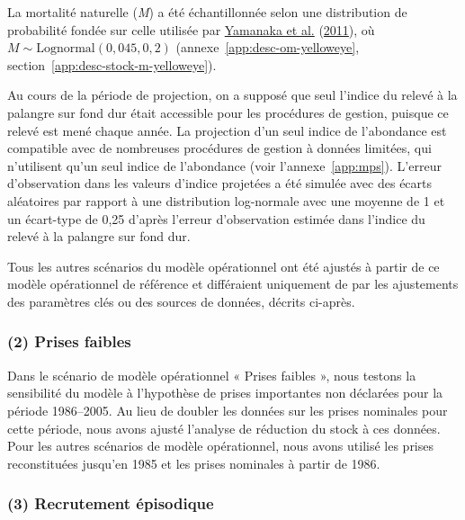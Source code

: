 \documentclass[11pt]{book}
\begin{document}
La mortalité naturelle (\emph{M}) a été échantillonnée selon une distribution de probabilité fondée sur celle utilisée par \protect\hyperlink{ref-yamanaka2011}{Yamanaka et al.} (\protect\hyperlink{ref-yamanaka2011}{2011}), où \(M \sim \textrm{Lognormal}(0,045, 0,2)\) (annexe~\ref{app:desc-om-yelloweye}, section~\ref{app:desc-stock-m-yelloweye}).

Au cours de la période de projection, on a supposé que seul l'indice du relevé à la palangre sur fond dur était accessible pour les procédures de gestion, puisque ce relevé est mené chaque année. La projection d'un seul indice de l'abondance est compatible avec de nombreuses procédures de gestion à données limitées, qui n'utilisent qu'un seul indice de l'abondance (voir l'annexe~\ref{app:mps}). L'erreur d'observation dans les valeurs d'indice projetées a été simulée avec des écarts aléatoires par rapport à une distribution log-normale avec une moyenne de 1 et un écart-type de 0,25 d'après l'erreur d'observation estimée dans l'indice du relevé à la palangre sur fond dur.

Tous les autres scénarios du modèle opérationnel ont été ajustés à partir de ce modèle opérationnel de référence et différaient uniquement de par les ajustements des paramètres clés ou des sources de données, décrits ci-après.

\hypertarget{sec:approach3-reference2}{%
\subsubsection{(2) Prises faibles}\label{sec:approach3-reference2}}

Dans le scénario de modèle opérationnel « Prises faibles », nous testons la sensibilité du modèle à l'hypothèse de prises importantes non déclarées pour la période 1986--2005. Au lieu de doubler les données sur les prises nominales pour cette période, nous avons ajusté l'analyse de réduction du stock à ces données. Pour les autres scénarios de modèle opérationnel, nous avons utilisé les prises reconstituées jusqu'en 1985 et les prises nominales à partir de 1986.

\hypertarget{sec:approach3-reference3}{%
\subsubsection{(3) Recrutement épisodique}\label{sec:approach3-reference3}}
\end{document}
